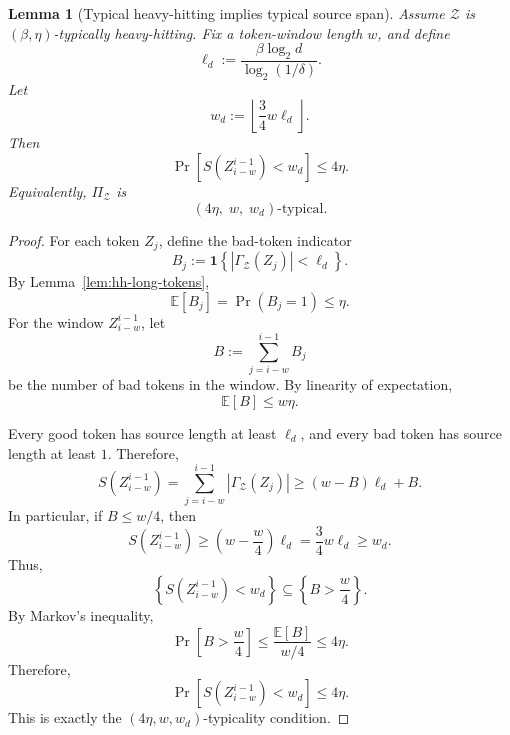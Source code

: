 \documentclass[10pt,a4paper]{amsart}
\newtheorem{lemma}{Lemma}
\begin{document}
    \begin{lemma}[Typical heavy-hitting implies typical source span]
    \label{lem:hh-typical-source-span}
    Assume $\mathcal Z$ is $(\beta,\eta)$-typically heavy-hitting. Fix a
    token-window length $w$, and define
    \[
        \ell_d
        :=
        \frac{\beta\log_2 d}{\log_2(1/\delta)}.
    \]
    Let
    \[
        w_d
        :=
        \left\lfloor \frac{3}{4}w\ell_d \right\rfloor .
    \]
    Then
    \[
        \Pr\!\left[
            S(Z_{i-w}^{i-1}) < w_d
        \right]
        \le
        4\eta.
    \]
    Equivalently, $\Pi_{\mathcal Z}$ is
    \[
        \left(4\eta,\; w,\; w_d\right)\text{-typical}.
    \]
    \end{lemma}

    \begin{proof}
    For each token $Z_j$, define the bad-token indicator
    \[
        B_j
        :=
        \mathbf 1\left\{
            |\Gamma_{\mathcal Z}(Z_j)|<\ell_d
        \right\}.
    \]
    By Lemma~\ref{lem:hh-long-tokens},
    \[
        \mathbb E[B_j]=\Pr(B_j=1)\le \eta.
    \]
    For the window $Z_{i-w}^{i-1}$, let
    \[
        B
        :=
        \sum_{j=i-w}^{i-1}B_j
    \]
    be the number of bad tokens in the window. By linearity of expectation,
    \[
        \mathbb E[B]\le w\eta.
    \]
    
    Every good token has source length at least $\ell_d$, and every bad token has
    source length at least $1$. Therefore,
    \[
        S(Z_{i-w}^{i-1})
        =
        \sum_{j=i-w}^{i-1}|\Gamma_{\mathcal Z}(Z_j)|
        \ge
        (w-B)\ell_d + B.
    \]
    In particular, if $B\le w/4$, then
    \[
        S(Z_{i-w}^{i-1})
        \ge
        \left(w-\frac{w}{4}\right)\ell_d
        =
        \frac{3}{4}w\ell_d
        \ge
        w_d.
    \]
    Thus,
    \[
        \left\{
            S(Z_{i-w}^{i-1}) < w_d
        \right\}
        \subseteq
        \left\{
            B>\frac{w}{4}
        \right\}.
    \]
    By Markov's inequality,
    \[
        \Pr\!\left[
            B>\frac{w}{4}
        \right]
        \le
        \frac{\mathbb E[B]}{w/4}
        \le
        4\eta.
    \]
    Therefore,
    \[
        \Pr\!\left[
            S(Z_{i-w}^{i-1}) < w_d
        \right]
        \le
        4\eta.
    \]
    This is exactly the $\left(4\eta,w,w_d\right)$-typicality condition.
    \end{proof}
\end{document}
